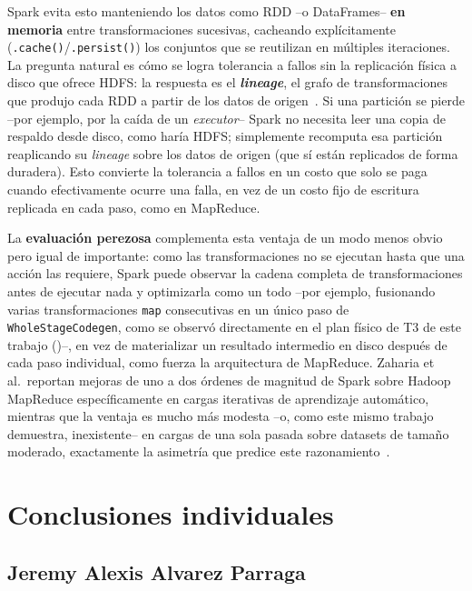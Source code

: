 \documentclass[11pt,a4paper]{article}
\begin{document}
    Spark evita esto manteniendo los datos como RDD --o DataFrames-- \textbf{en memoria} entre
    transformaciones sucesivas, cacheando explícitamente (\texttt{.cache()}/\texttt{.persist()})
    los conjuntos que se reutilizan en múltiples iteraciones. La pregunta natural es cómo se logra
    tolerancia a fallos sin la replicación física a disco que ofrece HDFS: la respuesta es el
    \textbf{\emph{lineage}}, el grafo de transformaciones que produjo cada RDD a partir de los datos
    de origen~\autocite{zaharia2012}. Si una partición se pierde --por ejemplo, por la caída de un
    \emph{executor}-- Spark no necesita leer una copia de respaldo desde disco, como haría HDFS;
    simplemente recomputa esa partición reaplicando su \emph{lineage} sobre los datos de origen
    (que sí están replicados de forma duradera). Esto convierte la tolerancia a fallos en un costo
    que solo se paga cuando efectivamente ocurre una falla, en vez de un costo fijo de escritura
    replicada en cada paso, como en MapReduce.

    La \textbf{evaluación perezosa} complementa esta ventaja de un modo menos obvio pero igual de
    importante: como las transformaciones no se ejecutan hasta que una acción las requiere, Spark
    puede observar la cadena completa de transformaciones antes de ejecutar nada y optimizarla como
    un todo --por ejemplo, fusionando varias transformaciones \texttt{map} consecutivas en un único
    paso de \texttt{WholeStageCodegen}, como se observó directamente en el plan físico de T3 de
    este trabajo ()--, en vez de materializar un resultado intermedio en disco
    después de cada paso individual, como fuerza la arquitectura de MapReduce. Zaharia et al.\
    reportan mejoras de uno a dos órdenes de magnitud de Spark sobre Hadoop MapReduce
    específicamente en cargas iterativas de aprendizaje automático, mientras que la ventaja es
    mucho más modesta --o, como este mismo trabajo demuestra, inexistente-- en cargas de una sola
    pasada sobre datasets de tamaño moderado, exactamente la asimetría que predice este
    razonamiento~\autocite{zaharia2012}.
    
    \section{Conclusiones individuales}
    \label{sec:conclusiones}

    \subsection*{Jeremy Alexis Alvarez Parraga}
\end{document}
